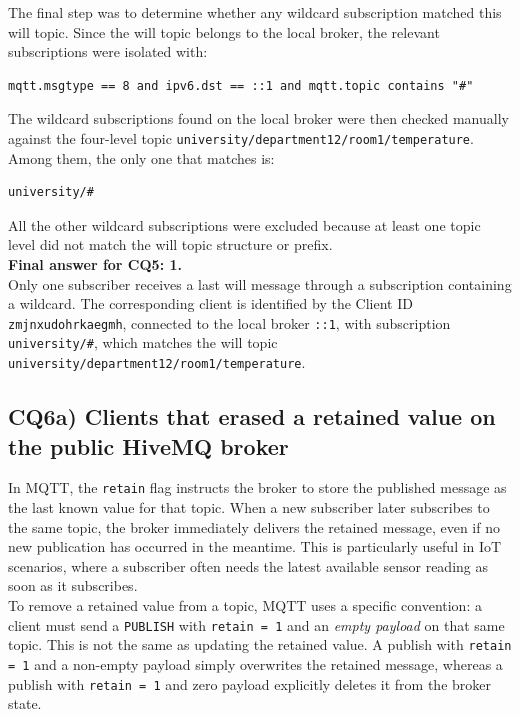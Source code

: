 \documentclass[a4paper,11pt]{article}
\begin{document}
The final step was to determine whether any wildcard subscription matched this will
topic. Since the will topic belongs to the local broker, the relevant subscriptions
were isolated with:

\begin{lstlisting}
mqtt.msgtype == 8 and ipv6.dst == ::1 and mqtt.topic contains "#"
\end{lstlisting}

The wildcard subscriptions found on the local broker were then checked manually
against the four-level topic
\texttt{university/department12/room1/temperature}. Among them, the only one that
matches is:

\begin{lstlisting}
university/#
\end{lstlisting}

All the other wildcard subscriptions were excluded because at least one topic level
did not match the will topic structure or prefix.\\

\textbf{Final answer for CQ5: 1.}\\

Only one subscriber receives a last will message through a subscription containing a
wildcard. The corresponding client is identified by the Client ID
\texttt{zmjnxudohrkaegmh}, connected to the local broker \texttt{::1}, with
subscription \texttt{university/\#}, which matches the will topic
\texttt{university/department12/room1/temperature}.

\subsection{CQ6a) Clients that erased a retained value on the public HiveMQ broker}

In MQTT, the \texttt{retain} flag instructs the broker to store the published message
as the last known value for that topic. When a new subscriber later subscribes to the
same topic, the broker immediately delivers the retained message, even if no new
publication has occurred in the meantime. This is particularly useful in IoT
scenarios, where a subscriber often needs the latest available sensor reading as soon
as it subscribes.\\

To remove a retained value from a topic, MQTT uses a specific convention: a client
must send a \texttt{PUBLISH} with \texttt{retain = 1} and an \emph{empty payload} on
that same topic. This is not the same as updating the retained value. A publish with
\texttt{retain = 1} and a non-empty payload simply overwrites the retained message,
whereas a publish with \texttt{retain = 1} and zero payload explicitly deletes it
from the broker state.\\
\end{document}
